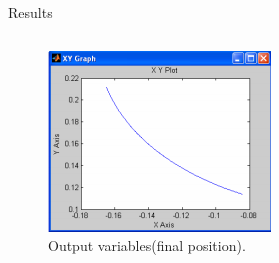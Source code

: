 \begin{frame}{Results}
\begin{columns}
            \begin{column}{0.5\textwidth}
                \begin{figure}
                \centering
                \includegraphics[width=.8\textwidth]{fig/fig1.png}
                \caption{Output variables(final position).}
                \end{figure}
            \end{column}
        \end{columns}
    \end{frame}

